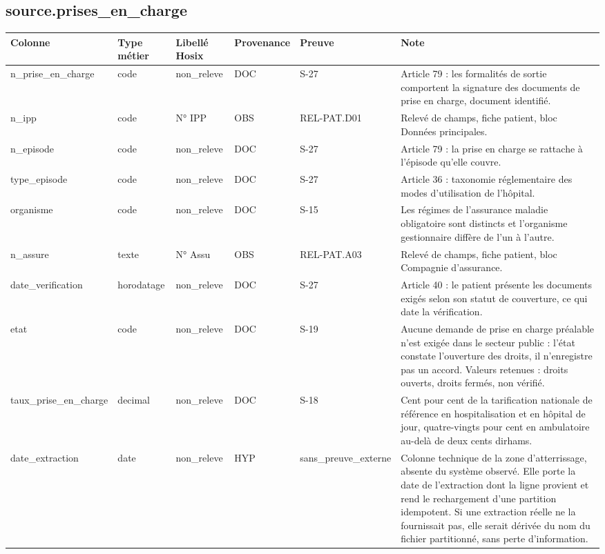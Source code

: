 \subsection*{source.prises\_en\_charge}
\begin{longtable}{p{2.5cm}p{1.8cm}p{2.8cm}p{1.3cm}p{2.2cm}p{5cm}}
\hline
Colonne & Type métier & Libellé Hosix & Provenance & Preuve & Note \\
\hline
\endhead
n\_prise\_en\_charge & code & non\_releve & DOC & S-27 & Article 79 : les formalités de sortie comportent la signature des documents de prise en charge, document identifié. \\
n\_ipp & code & N° IPP & OBS & REL-PAT.D01 & Relevé de champs, fiche patient, bloc Données principales. \\
n\_episode & code & non\_releve & DOC & S-27 & Article 79 : la prise en charge se rattache à l'épisode qu'elle couvre. \\
type\_episode & code & non\_releve & DOC & S-27 & Article 36 : taxonomie réglementaire des modes d'utilisation de l'hôpital. \\
organisme & code & non\_releve & DOC & S-15 & Les régimes de l'assurance maladie obligatoire sont distincts et l'organisme gestionnaire diffère de l'un à l'autre. \\
n\_assure & texte & N° Assu & OBS & REL-PAT.A03 & Relevé de champs, fiche patient, bloc Compagnie d'assurance. \\
date\_verification & horodatage & non\_releve & DOC & S-27 & Article 40 : le patient présente les documents exigés selon son statut de couverture, ce qui date la vérification. \\
etat & code & non\_releve & DOC & S-19 & Aucune demande de prise en charge préalable n'est exigée dans le secteur public : l'état constate l'ouverture des droits, il n'enregistre pas un accord. Valeurs retenues : droits ouverts, droits fermés, non vérifié. \\
taux\_prise\_en\_charge & decimal & non\_releve & DOC & S-18 & Cent pour cent de la tarification nationale de référence en hospitalisation et en hôpital de jour, quatre-vingts pour cent en ambulatoire au-delà de deux cents dirhams. \\
date\_extraction & date & non\_releve & HYP & sans\_preuve\_externe & Colonne technique de la zone d'atterrissage, absente du système observé. Elle porte la date de l'extraction dont la ligne provient et rend le rechargement d'une partition idempotent. Si une extraction réelle ne la fournissait pas, elle serait dérivée du nom du fichier partitionné, sans perte d'information. \\
\hline
\end{longtable}

